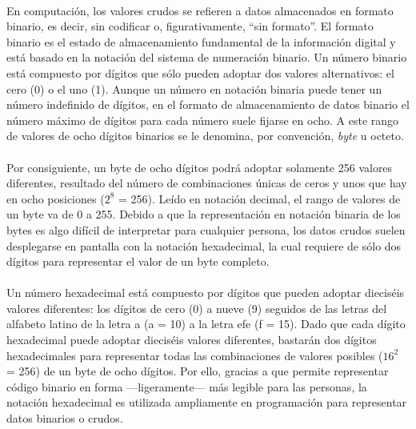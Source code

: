 \documentclass{article}[letter, 12pt]
\begin{document}
\paragraph{}En computación, los valores crudos se refieren a datos almacenados en formato binario, es decir, sin codificar o, figurativamente, “sin formato”. El formato binario es el estado de almacenamiento fundamental de la información digital y está basado en la notación del sistema de numeración binario. Un número binario está compuesto por dígitos que sólo pueden adoptar dos valores alternativos: el cero (0) o el uno (1). Aunque un número en notación binaria puede tener un número indefinido de dígitos, en el formato de almacenamiento de datos binario el número máximo de dígitos para cada número suele fijarse en ocho. A este rango de valores de ocho dígitos binarios se le denomina, por convención, \textit{byte} u octeto.\par

\paragraph{}Por consiguiente, un byte de ocho dígitos podrá adoptar solamente 256 valores diferentes, resultado del número de combinaciones únicas de ceros y unos que hay en ocho posiciones ($2^8$ = 256). Leído en notación decimal, el rango de valores de un byte va de 0 a 255. Debido a que la representación en notación binaria de los bytes es algo difícil de interpretar para cualquier persona, los datos crudos suelen desplegarse en pantalla con la notación hexadecimal, la cual requiere de sólo dos dígitos para representar el valor de un byte completo.\par

\paragraph{}Un número hexadecimal está compuesto por dígitos que pueden adoptar dieciséis valores diferentes: los dígitos de cero (0) a nueve (9) seguidos de las letras del alfabeto latino de la letra a (a = 10) a la letra efe (f = 15). Dado que cada dígito hexadecimal puede adoptar dieciséis valores diferentes, bastarán dos dígitos hexadecimales para representar todas las combinaciones de valores posibles ($16^2$ = 256) de un byte de ocho dígitos. Por ello, gracias a que permite representar código binario en forma —ligeramente— más legible para las personas, la notación hexadecimal es utilizada ampliamente en programación para representar datos binarios o crudos.\par
\end{document}
